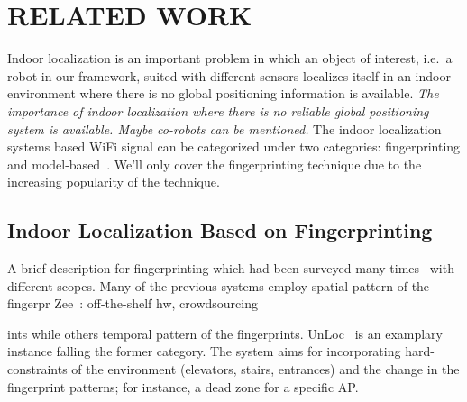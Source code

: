 \documentclass[letterpaper, 10 pt, conference]{ieeeconf}  %
\newcommand{\lorem}{
}
\begin{document}
\section{\label{sec-RW}RELATED WORK}
  Indoor localization is an important problem in which an object of interest, i.e.\ a robot in our framework, suited with different sensors localizes itself in an indoor environment where there is no global positioning information is available.
  \textit{The importance of indoor localization where there is no reliable global positioning system is available.
  Maybe co-robots can be mentioned.}
  The indoor localization systems based WiFi signal can be categorized under two categories: fingerprinting and model-based~\cite{hossain2015survey}.
  We'll only cover the fingerprinting technique due to the increasing popularity of the technique.

  \subsection{Indoor Localization Based on Fingerprinting}
    A brief description for fingerprinting which had been surveyed many times~\cite{he2016wi, liu2007survey} with different scopes.
    Many of the previous systems employ spatial pattern of the fingerpr    Zee~\cite{rai2012zee}: off-the-shelf hw, crowdsourcing
    \lorem{}ints while others temporal pattern of the fingerprints.
    UnLoc~\cite{wang2012no} is an examplary instance falling the former category.
    The system aims for incorporating hard-constraints of the environment (elevators, stairs, entrances) and the change in the fingerprint patterns; for instance, a dead zone for a specific AP\@.

\end{document}

